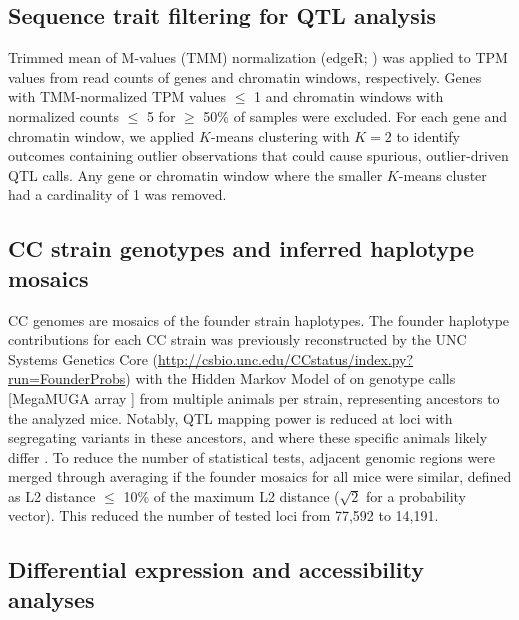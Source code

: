 \documentclass[9pt,twocolumn,twoside]{gsajnl}
\begin{document}
\subsection{Sequence trait filtering for QTL analysis}

Trimmed mean of M-values (TMM) normalization (edgeR; \citealt{edgeR}) was applied to TPM values from read counts of genes and chromatin windows, respectively. Genes with TMM-normalized TPM values $\leq$ 1 and chromatin windows with normalized counts $\leq$ 5 for $\geq$ 50\% of samples were excluded. For each gene and chromatin window, we applied $K$-means clustering with $K=2$ to identify outcomes containing outlier observations that could cause spurious, outlier-driven QTL calls. Any gene or chromatin window where the smaller $K$-means cluster had a cardinality of 1 was removed.

\subsection{CC strain genotypes and inferred haplotype mosaics}

CC genomes are mosaics of the founder strain haplotypes. The founder haplotype contributions for each CC strain was previously reconstructed by the UNC Systems Genetics Core (\url{http://csbio.unc.edu/CCstatus/index.py?run=FounderProbs}) with the Hidden Markov Model of \cite{Fu2012} on genotype calls [MegaMUGA array \citep{Morgan2016muga}] from multiple animals per strain, representing ancestors to the analyzed mice. Notably, QTL mapping power is reduced at loci with segregating variants in these ancestors, and where these specific animals likely differ \citep{Shorter2019}. To reduce the number of statistical tests, adjacent genomic regions were merged through averaging if the founder mosaics for all mice were similar, defined as L2 distance $\leq$ 10\% of the maximum L2 distance ($\sqrt{2}$ for a probability vector). This reduced the number of tested loci from 77,592 to 14,191.

\subsection{Differential expression and accessibility analyses}
\end{document}
